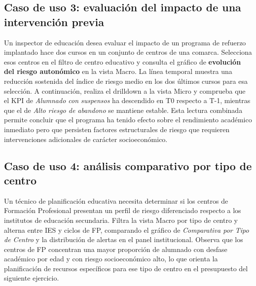 \subsection{Caso de uso 3: evaluación del impacto de una intervención previa}

Un inspector de educación desea evaluar el impacto de un programa de refuerzo implantado hace dos cursos en un conjunto de centros de una comarca. Selecciona esos centros en el filtro de centro educativo y consulta el gráfico de \textbf{evolución del riesgo autonómico} en la vista Macro. La línea temporal muestra una reducción sostenida del índice de riesgo medio en los dos últimos cursos para esa selección. A continuación, realiza el drilldown a la vista Micro y comprueba que el KPI de \textit{Alumnado con suspensos} ha descendido en T0 respecto a T-1, mientras que el de \textit{Alto riesgo de abandono} se mantiene estable. Esta lectura combinada permite concluir que el programa ha tenido efecto sobre el rendimiento académico inmediato pero que persisten factores estructurales de riesgo que requieren intervenciones adicionales de carácter socioeconómico.

\subsection{Caso de uso 4: análisis comparativo por tipo de centro}

Un técnico de planificación educativa necesita determinar si los centros de Formación Profesional presentan un perfil de riesgo diferenciado respecto a los institutos de educación secundaria. Filtra la vista Macro por tipo de centro y alterna entre IES y ciclos de FP, comparando el gráfico de \textit{Comparativa por Tipo de Centro} y la distribución de alertas en el panel institucional. Observa que los centros de FP concentran una mayor proporción de alumnado con desfase académico por edad y con riesgo socioeconómico alto, lo que orienta la planificación de recursos específicos para ese tipo de centro en el presupuesto del siguiente ejercicio.
